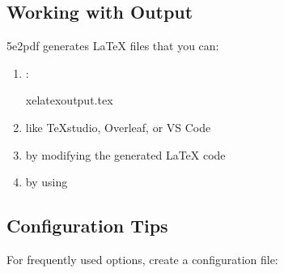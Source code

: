 \documentclass[letterpaper,10pt,english]{sphinxmanual}
\begin{document}
\subsection{Working with Output}
\label{\detokenize{user-guide/quickstart:working-with-output}}
\sphinxAtStartPar
5e2pdf generates LaTeX files that you can:
\begin{enumerate}
%
\item {} 
\sphinxAtStartPar
{}:

\begin{sphinxVerbatim}[commandchars=\\\{\}]
xelatexoutput.tex
\end{sphinxVerbatim}

\item {} 
\sphinxAtStartPar
{} like TeXstudio, Overleaf, or VS Code

\item {} 
\sphinxAtStartPar
{} by modifying the generated LaTeX code

\item {} 
\sphinxAtStartPar
{} by using 

\end{enumerate}


\subsection{Configuration Tips}
\label{\detokenize{user-guide/quickstart:configuration-tips}}
\sphinxAtStartPar
For frequently used options, create a configuration file:

\begin{sphinxVerbatim}[commandchars=\\\{\}]

\end{sphinxVerbatim}
\end{document}
